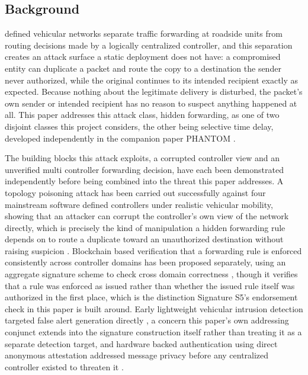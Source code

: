 \documentclass[final,5p,twocolumn]{elsarticle}
\theoremstyle{remark}
\theoremstyle{plain}
\begin{document}
\subsection{Background}

 defined vehicular networks separate traffic forwarding at
roadside units from routing decisions made by a logically centralized
controller, and this separation creates an attack surface a static
deployment does not have: a compromised entity can duplicate a packet and
route the copy to a destination the sender never authorized, while the
original continues to its intended recipient exactly as expected. Because
nothing about the legitimate delivery is disturbed, the packet's own
sender or intended recipient has no reason to suspect anything happened
at all. This paper addresses this attack class, hidden forwarding, as one
of two disjoint classes this project considers, the other being selective
time delay, developed independently in the companion paper PHANTOM
\cite{Phantom2026}.

The building blocks this attack exploits, a corrupted controller view and
an unverified multi controller forwarding decision, have each been
demonstrated independently before being combined into the threat this
paper addresses. A topology poisoning attack has been carried out
successfully against four mainstream software defined controllers under
realistic vehicular mobility, showing that an attacker can corrupt the
controller's own view of the network directly, which is precisely the
kind of manipulation a hidden forwarding rule depends on to route a
duplicate toward an unauthorized destination without raising suspicion
\cite{Wang2020Topology}. Blockchain based verification that a forwarding
rule is enforced consistently across controller domains has been proposed
separately, using an aggregate signature scheme to check cross domain
correctness \cite{Li2022BlockREV}, though it verifies that a rule was
enforced as issued rather than whether the issued rule itself was
authorized in the first place, which is the distinction Signature S5's
endorsement check in this paper is built around. Early lightweight
vehicular intrusion detection targeted false alert generation directly
\cite{Sedjelmaci2014}, a concern this paper's own addressing conjunct
extends into the signature construction itself rather than treating it as
a separate detection target, and hardware backed authentication using
direct anonymous attestation addressed message privacy before any
centralized controller existed to threaten it \cite{Sumra2011}.
\end{document}
